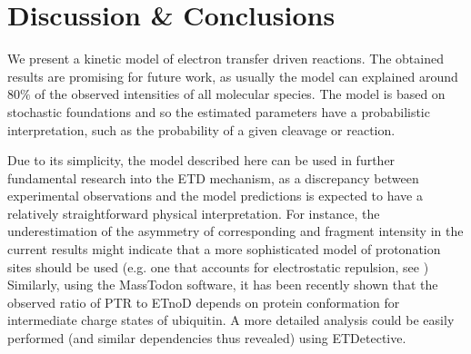 \documentclass{llncs}
\begin{document}
\section{Discussion \& Conclusions}
We present a kinetic model of electron transfer driven reactions. The obtained results are promising for future work, as usually the model can explained around $80\%$ of the observed intensities of all molecular species. The model is based on stochastic foundations and so the estimated parameters have a probabilistic interpretation, such as the probability of a given cleavage or reaction.

Due to its simplicity, the model described here can be used in further fundamental research into the ETD mechanism, as a discrepancy between experimental observations and the model predictions is expected to have a relatively straightforward physical interpretation. For instance, the underestimation of the asymmetry of corresponding  and  fragment intensity in the current results might indicate that a more sophisticated model of protonation sites should be used (e.g. one that accounts for electrostatic repulsion, see \cite{Morrison2016-wc}) Similarly, using the {\sc MassTodon} software, it has been recently shown \cite{Lermyte2017-zt} that the observed ratio of PTR to ETnoD depends on protein conformation for intermediate charge states of ubiquitin. A more detailed  analysis could be easily performed (and similar dependencies thus revealed) using ETDetective.

\end{document}
